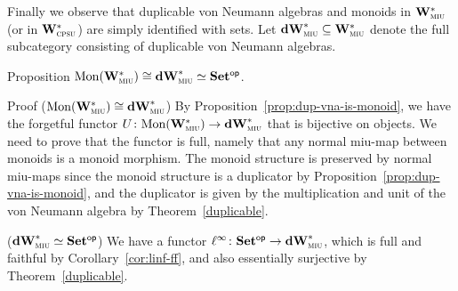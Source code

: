\documentclass[a]{subfiles}
\begin{document}
\begin{parsec}
Finally we observe that duplicable von Neumann algebras and
monoids in $\mathbf{W}^*_{\text{\textsc{miu}}}$ (or in $\mathbf{W}^*_{\text{\textsc{cpsu}}}$) are simply identified with sets.
Let $\mathbf{dW}^*_{\text{\textsc{miu}}}\subseteq\mathbf{W}^*_{\text{\textsc{miu}}}$ denote the full subcategory
consisting of duplicable von Neumann algebras.

\begin{point}{Proposition}
	$\mathrm{Mon}(\mathbf{W}^*_{\text{\textsc{miu}}})\cong\mathbf{dW}^*_{\text{\textsc{miu}}}\simeq{\mathbf{Set}}{^{\mathsf{op}}}$.
\end{point}
\begin{point}{Proof}
($\mathrm{Mon}(\mathbf{W}^*_{\text{\textsc{miu}}})\cong\mathbf{dW}^*_{\text{\textsc{miu}}}$)
By Proposition~\ref{prop:dup-vna-is-monoid},
we have the forgetful functor $U\colon\mathrm{Mon}(\mathbf{W}^*_{\text{\textsc{miu}}})\to\mathbf{dW}^*_{\text{\textsc{miu}}}$
that is bijective on objects.
We need to prove that the functor is full,
namely that any normal miu-map between monoids
is a monoid morphism.
The monoid structure is preserved by normal miu-maps
since the monoid structure is a duplicator
by Proposition~\ref{prop:dup-vna-is-monoid},
and the duplicator is given by the multiplication and unit
of the von Neumann algebra by Theorem~\ref{duplicable}.

($\mathbf{dW}^*_{\text{\textsc{miu}}}\simeq{\mathbf{Set}}{^{\mathsf{op}}}$)
We have a functor $\ell^\infty\colon{\mathbf{Set}}{^{\mathsf{op}}}\to\mathbf{dW}^*_{\text{\textsc{miu}}}$,
which is full and faithful by Corollary~\ref{cor:linf-ff},
and also essentially surjective
by Theorem~\ref{duplicable}.
\end{point}
\end{parsec}
\end{document}
